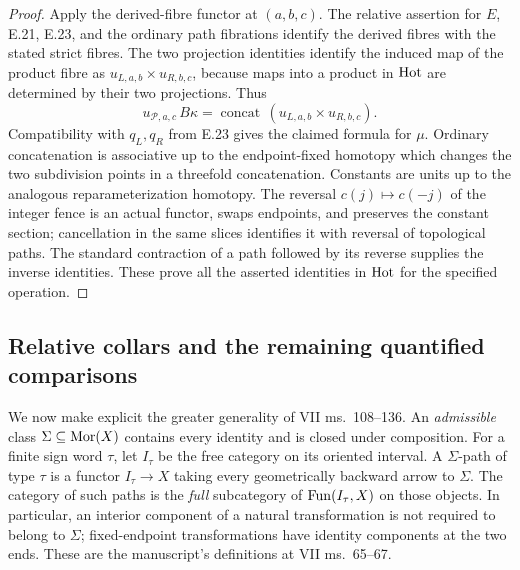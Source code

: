 \begin{proof}
Apply the derived-fibre functor at $(a,b,c)$. The relative assertion for $E$, E.21, E.23, and the ordinary path fibrations identify the derived fibres with the stated strict fibres. The two projection identities identify the induced map of the product fibre as $u_{L,a,b}\times u_{R,b,c}$, because maps into a product in $\mathrm{Hot}$ are determined by their two projections. Thus
\[
 u_{\mathcal P,a,c}\,B\kappa
 =\operatorname{concat}\,(u_{L,a,b}\times u_{R,b,c}).
\]
Compatibility with $q_L,q_R$ from E.23 gives the claimed formula for $\mu$. Ordinary concatenation is associative up to the endpoint-fixed homotopy which changes the two subdivision points in a threefold concatenation. Constants are units up to the analogous reparameterization homotopy. The reversal $c(j)\mapsto c(-j)$ of the integer fence is an actual functor, swaps endpoints, and preserves the constant section; cancellation in the same slices identifies it with reversal of topological paths. The standard contraction of a path followed by its reverse supplies the inverse identities. These prove all the asserted identities in $\mathrm{Hot}$ for the specified operation.
\end{proof}

\subsection{Relative collars and the remaining quantified comparisons}

We now make explicit the greater generality of VII ms.~108--136. An \emph{admissible} class $\Sigma\subseteq\operatorname{Mor}(X)$ contains every identity and is closed under composition. For a finite sign word $\tau$, let $I_\tau$ be the free category on its oriented interval. A $\Sigma$-path of type $\tau$ is a functor $I_\tau\to X$ taking every geometrically backward arrow to $\Sigma$. The category of such paths is the \emph{full} subcategory of $\operatorname{Fun}(I_\tau,X)$ on those objects. In particular, an interior component of a natural transformation is not required to belong to $\Sigma$; fixed-endpoint transformations have identity components at the two ends. These are the manuscript's definitions at VII ms.~65--67.

